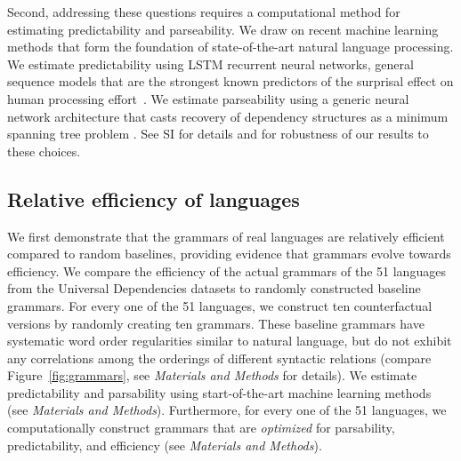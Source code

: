\documentclass[9pt,twocolumn,twoside,lineno]{pnas-new}
\begin{document}
Second, addressing these questions requires a computational method for estimating predictability and parseability.
We draw on recent machine learning methods that form the foundation of state-of-the-art natural language processing.
We estimate predictability using LSTM recurrent neural networks, general sequence models that are the strongest known predictors of the surprisal effect on human processing effort~\citep{frank2011insensitivity,goodkind2018predictive}.
We estimate parseability using a generic neural network architecture that casts recovery of dependency structures as a minimum spanning tree problem \citep{dozat2017stanford, zhang2017dependency}.
See SI for details and for robustness of our results to these choices.

\subsection{Relative efficiency of languages}
\label{sec:relative-efficiency}



We first demonstrate that the grammars of real languages are relatively efficient compared to random baselines, providing evidence that grammars evolve towards efficiency.
We compare the efficiency of the actual grammars of the 51 languages from the Universal Dependencies datasets to randomly constructed baseline grammars.
For every one of the 51 languages, we construct ten counterfactual versions by randomly creating ten grammars.
These baseline grammars have systematic word order regularities similar to natural language, but do not exhibit any correlations among the orderings of different syntactic relations (compare Figure~\ref{fig:grammars}, see \textit{Materials and Methods} for details).
We estimate predictability and parsability using start-of-the-art machine learning methods (see \textit{Materials and Methods}).
Furthermore, for every one of the 51 languages, we computationally construct grammars that are \emph{optimized} for parsability, predictability, and efficiency (see \textit{Materials and Methods}).
\end{document}
